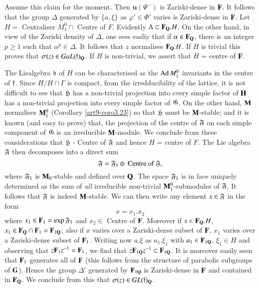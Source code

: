 \subsection{}\label{art9-subsec3.28}
Assume this claim for the moment. Then $\textbf{u} (\Psi^{-})$ is Zariski-dense in $\mathbf{F}$. It follows that the group $\Delta$ generated by $\{a , \xi\}$ as $\varphi' \in \Phi'$ varies is Zariski-dense in $\mathbf{F}$. Let $H =$ Centraliser $M^0_1 \cap$  Centre of $F$. Evidently $\Delta \subset \mathbf{F}_{\mathbf{Q}}.H$. On the other hand, in view of the Zariski density of $\Delta$, one sees easliy that if $\alpha \in\mathbf{F}_{\mathbf{Q}}$, there is an integer $p \geq 1$ such that $\alpha^p \in\Delta$. It follows that $z$ normalises $\mathbf{F}_{\mathbf{Q}}.H$. If $H$ is trivial this proves that $\sigma (z) \in Ga L (\mathfrak{f})_{\mathbf{Q}}$. If $H$ is non-trivial, we assert that $H$ = centre of $\mathbf{F}$.

The Lie\pageoriginale algebra $\mathfrak{h}$ of $H$ can be characterised as the $\operatorname{Ad} M^0_1$ invariants in the centre of $\mathfrak{f}$. Since $H/H \cap \Gamma$ is compact, from the irredducibility of the lattice, it is not difficult to see that $\mathfrak{H}$ has a non-trivial projection into every simple factor of $\mathbf{H}$ has a non-trivial projection into every simple factor of $\mathfrak{G}$.  On the other hand, $\mathbf{M}$ normalises $\mathbf{M}^0_1$ (Corollary \ref{art9-coro3.23}) so that $\mathfrak{H}$ must be $\mathbf{M}$-stable; and it is known (and easy to prove) that, the projection of the centre of $\mathfrak{F}$ on each simple component of $\mathfrak{G}$ is an irreducible $\mathbf{M}$-module. We conclude from these considerations that $\mathfrak{H}$ - Centre of $\mathfrak{F}$ and hence $H$ = centre of $F$. The Lie algebra $\mathfrak{F}$ then decomposes into a direct sum
$$
\mathfrak{F} = \mathfrak{F}_1 \oplus \text{ Centre of } \mathfrak{F},
$$
where $\mathfrak{F}_1$ is $\mathbf{M}_0$-stable and defined over $\mathbf{Q}$. The space $\mathfrak{F}_1$ is in face uniquely determined as the sum of \textit{all} irreducible non-trivial $\mathbf{M}^0_1$-submodules of $\mathfrak{F}$. It follows that $\mathfrak{F}$ is indeed $\mathbf{M}$-stable. We can then write any element $x \in \mathfrak{F}$ in the form
$$
x = x_1. x_2
$$
where $x_1 \in \mathbf{F}_1 = \exp \mathfrak{F}_1$ and $x_2 \in $ Centre of $\mathbf{F}$. Moreover if $x \in \mathbf{F}_{\mathbf{Q}}. H$, $x_1 \in \mathbf{F}_{\mathbf{Q}} \cap \mathbf{F}_1 = \mathbf{F}_{1\mathbf{Q}}$; also if $x$ varies over a Zariski-dense subset of $\mathbf{F}$, $x_1$ varies over a Zariski-dense subset of $\mathbf{F}_1$. Writing now $a . \xi$ as $a_1 . \xi_1$ with $a_1 \in \mathbf{F}_{1\mathbf{Q}}$, $\xi_1 \in H$ and observing that $z \mathbf{F}_1 z^{-1} = \mathbf{F}_1$, we find that $z \mathbf{F}_{1\mathbf{Q}} z^{-1} \subset \mathbf{F}_{1\mathbf{Q}}$. It is moreover easily seen that $\mathbf{F}_1$ generates all of $\mathbf{F}$ (this follows from the structure of parabolic subgroups of $\mathbf{G}$). Hence the group $\Delta'$ generated by $\mathbf{F}_{1\mathbf{Q}}$ is Zariski-dense in $\mathbf{F}$ and contained in $\mathbf{F}_{\mathbf{Q}}$. We conclude from this that $\sigma (z) \in G L (\mathfrak{f})_{\mathbf{Q}}$.

